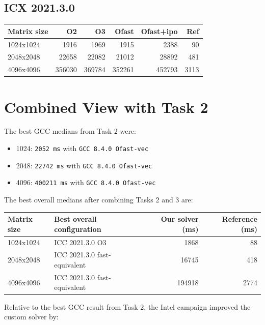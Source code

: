 \documentclass[11pt,a4paper]{article}
\begin{document}
\subsection{ICX 2021.3.0}

\begin{table}[h]
\centering
\begin{tabular}{lrrrrr}
\toprule
Matrix size & O2 & O3 & Ofast & Ofast+ipo & Ref \\
\midrule
1024x1024 & 1916 & 1969 & 1915 & 2388 & 90 \\
2048x2048 & 22658 & 22082 & 21012 & 28892 & 481 \\
4096x4096 & 356030 & 369784 & 352261 & 452793 & 3113 \\
\bottomrule
\end{tabular}
\end{table}

\section{Combined View with Task 2}

The best GCC medians from Task 2 were:

\begin{itemize}
\item 1024: \texttt{2052 ms} with \texttt{GCC 8.4.0 Ofast-vec}
\item 2048: \texttt{22742 ms} with \texttt{GCC 8.4.0 Ofast-vec}
\item 4096: \texttt{400211 ms} with \texttt{GCC 8.4.0 Ofast-vec}
\end{itemize}

The best overall medians after combining Tasks 2 and 3 are:

\begin{table}[h]
\centering
\begin{tabular}{l l rr}
\toprule
Matrix size & Best overall configuration & Our solver (ms) & Reference (ms) \\
\midrule
1024x1024 & ICC 2021.3.0 O3 & 1868 & 88 \\
2048x2048 & ICC 2021.3.0 fast-equivalent & 16745 & 418 \\
4096x4096 & ICC 2021.3.0 fast-equivalent & 194918 & 2774 \\
\bottomrule
\end{tabular}
\end{table}

Relative to the best GCC result from Task 2, the Intel campaign improved the
custom solver by:
\end{document}
